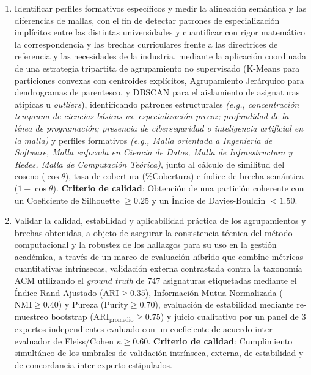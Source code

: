 \begin{enumerate}[label=\arabic*., nosep]
	\item Identificar perfiles formativos específicos y medir la alineación semántica y las diferencias de mallas, con el fin de detectar patrones de especialización implícitos entre las distintas universidades y cuantificar con rigor matemático la correspondencia y las brechas curriculares frente a las directrices de referencia y las necesidades de la industria, mediante la aplicación coordinada de una estrategia tripartita de agrupamiento no supervisado (K-Means para particiones convexas con centroides explícitos, Agrupamiento Jerárquico para dendrogramas de parentesco, y DBSCAN para el aislamiento de asignaturas atípicas u \textit{outliers}), identificando patrones estructurales \textit{(e.g., concentración temprana de ciencias básicas vs. especialización precoz; profundidad de la línea de programación; presencia de ciberseguridad o inteligencia artificial en la malla)} y perfiles formativos \textit{(e.g., Malla orientada a Ingeniería de Software, Malla enfocada en Ciencia de Datos, Malla de Infraestructura y Redes, Malla de Computación Teórica)}, junto al cálculo de similitud del coseno ($\cos \theta$), tasa de cobertura ($\% \text{Cobertura}$) e índice de brecha semántica ($1 - \cos \theta$). \textbf{Criterio de calidad}: Obtención de una partición coherente con un Coeficiente de Silhouette $\ge 0.25$ y un Índice de Davies-Bouldin $< 1.50$.

	\item Validar la calidad, estabilidad y aplicabilidad práctica de los agrupamientos y brechas obtenidas, a objeto de asegurar la consistencia técnica del método computacional y la robustez de los hallazgos para su uso en la gestión académica, a través de un marco de evaluación híbrido que combine métricas cuantitativas intrínsecas, validación externa contrastada contra la taxonomía ACM utilizando el \textit{ground truth} de 747 asignaturas etiquetadas mediante el Índice Rand Ajustado ($\text{ARI} \ge 0.35$), Información Mutua Normalizada ($\text{NMI} \ge 0.40$) y Pureza ($\text{Purity} \ge 0.70$), evaluación de estabilidad mediante re-muestreo bootstrap ($\text{ARI}_{\text{promedio}} \ge 0.75$) y juicio cualitativo por un panel de 3 expertos independientes evaluado con un coeficiente de acuerdo inter-evaluador de Fleiss/Cohen $\kappa \ge 0.60$. \textbf{Criterio de calidad}: Cumplimiento simultáneo de los umbrales de validación intrínseca, externa, de estabilidad y de concordancia inter-experto estipulados.


\end{enumerate}
